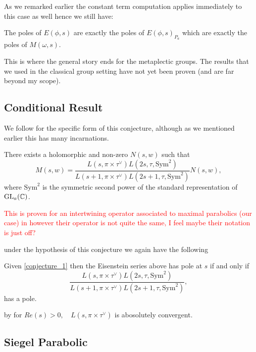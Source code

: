     As we remarked earlier the constant term computation applies immediately to this case as well hence we still have:
    \begin{Lemma}
            The poles of \(E(\phi, s)\) are exactly the poles of \(E(\phi,s)_{P_a}\) which are exactly the poles of \(M(\omega, s)\).
    \end{Lemma}
    This is where the general story ends for the metaplectic groups. The results that we used in the classical group setting have not yet been proven (and are far beyond my scope). 

    \subsection{Conditional Result}
     We follow \cite[Assumption 6.1]{wuThetaCorrespondenceSimple2024wuThetaCorrespondenceSimple2024} for the specific form of this conjecture, although as we mentioned earlier  this has many incarnations. 
     \begin{Conj}\label{conjecture_1}
        There exists a holomorphic and non-zero \(N(s,w)\) such that 
     \[M(s, w) = \frac{L(s, \pi\times \tau^{\vee}) L(2s, \tau, \mathrm{Sym}^2)}{L(s+1, \pi\times \tau^\vee)L(2s+1, \tau, \mathrm{Sym}^2)}N(s,w),\]
     where \(\mathrm{Sym}^2\) is the symmetric second power of the standard representation of \(\GL_a(\C)\).
     \end{Conj}
     \textcolor{red}{This is proven for an intertwining operator associated to maximal parabolics (our case) in \cite[Thm. 7.10]{gaoLanglandsShahidiFunctionsBrylinskiDeligne2018} however their operator is not quite the same, I feel maybe their notation is just off?}

     under the hypothesis of this conjecture we again have the following
     \begin{Lemma}
        Given \ref{conjecture_1} then the Eisenstein series above has pole at \(s\) if and only if 
        \[\frac{L(s, \pi\times \tau^{\vee}) L(2s, \tau, \mathrm{Sym}^2)}{L(s+1, \pi\times \tau^\vee)L(2s+1, \tau, \mathrm{Sym}^2)},\]
        has a pole.
     \end{Lemma}
     by \cite[Thm. 35]{kaplanDoublingConstructionsComplete2021a} for \(Re(s)>0, \quad L(s, \pi\times \tau^{\vee})\) is abosolutely convergent. 


    \subsection{Siegel Parabolic}


